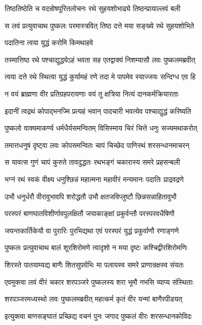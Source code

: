 \twolineshloka
{तिष्ठतिष्ठेति च वदन्रोषपूरितलोचनः}
{रथे सुहयशोभाढ्ये तिष्ठन्प्रायाल्लवं बली}%

\twolineshloka
{स लवं प्रत्युवाचाथ पुष्कलः परमास्त्रवित्}
{तिष्ठ दत्ते मया सङ्ख्ये रथे सुहयशोभिते}%

पदातिना त्वया युद्धं करोमि किमथाहवे

\twolineshloka
{तस्मात्तिष्ठ रथे पश्चाद्युद्ध्येऽहं भवता सह}
{एतद्वाक्यं निशम्यासौ लवः पुष्कलमब्रवीत्}%

\twolineshloka
{त्वया दत्ते रथे स्थित्वा युद्धं कुर्यामहं रणे}
{तदा मे पापमेव स्याज्जयः सन्दिग्ध एव हि}%

\twolineshloka
{न वयं ब्राह्मणा वीर प्रतिग्रहपरायणाः}
{वयं तु क्षत्रिया नित्यं दानकर्मक्रियारताः}%

\twolineshloka
{इदानीं त्वद्रथं कोपाद्भनज्मि प्रत्यहं भवान्}
{पादचारी भवत्येव पश्चाद्युद्धं करिष्यति}%

\twolineshloka
{पुष्कलो वाक्यमाकर्ण्य धर्मधैर्यसमन्वितम्}
{विसिस्माय चिरं चित्ते धनुः सज्यमथाकरोत्}%

\twolineshloka
{तमात्तधनुषं दृष्ट्वा लवः कोपसमन्वितः}
{चापं चिच्छेद पाणिस्थं शरसन्धानमाचरन्}%

\twolineshloka
{स यावत्स गुणं चापं कुरुते तावदुद्धतः}
{रथभङ्गं चकारास्य समरे प्रहसन्बली}%

\twolineshloka
{भग्नं रथं स्वकं वीक्ष्य धनुश्छिन्नं महात्मना}
{महावीरं मन्यमानः पदातिः प्राद्रवद्रणे}%

\twolineshloka
{उभौ धनुर्धरौ वीरावुभावपि शरोद्धतौ}
{उभौ क्षतजविप्लुष्टौ छिन्नसन्नाहितावुभौ}%

\twolineshloka
{परस्परं बाणघातविशीर्णावपुलक्षितौ}
{जयाकाङ्क्षां प्रकुर्वन्तौ परस्परवधैषिणौ}%

\twolineshloka
{जयन्तकार्तिकेयौ वा पुरारिः पुरभिद्यथा}
{एवं परस्परं युद्धं प्रकुर्वाणौ रणाङ्गणे}%

\twolineshloka
{पुष्कलः प्रत्युवाचाथ बालं शूरशिरोमणे}
{त्वादृशो न मया दृष्टः कश्चिद्वीरशिरोमणिः}%

\twolineshloka
{शिरस्ते पातयाम्यद्य बाणैः शितसुपर्वभिः}
{मा पलायस्व समरे प्राणान्रक्षस्व संयतः}%

\twolineshloka
{एवमुक्त्वा लवं वीरं चकार शरपञ्जरे}
{पुष्कलस्य शरा भूमौ नभसि व्याप्य संस्थिताः}%

\twolineshloka
{शरपञ्जरमध्यस्थो लवः पुष्कलमब्रवीत्}
{महत्कर्म कृतं वीर यन्मां बाणैरपीडयत्}%

\twolineshloka
{इत्युक्त्वा बाणसङ्घातं प्रच्छिद्य वचनं पुनः}
{जगाद पुष्कलं वीरः शरसन्धानकोविदः}%

